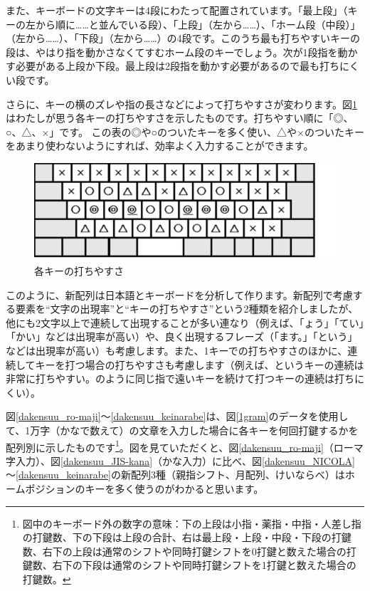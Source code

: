また、キーボードの文字キーは4段にわたって配置されています。「最上段」（キーの左から順に……と並んでいる段）、「上段」（左から……）、「ホーム段（中段）」（左から……）、「下段」（左から……）の4段です。このうち最も打ちやすいキーの段は、やはり指を動かさなくてすむホーム段のキーでしょう。次が1段指を動かす必要がある上段か下段。最上段は2段指を動かす必要があるので最も打ちにくい段です。

さらに、キーの横のズレや指の長さなどによって打ちやすさが変わります。図\ref{key_utiyasusa}はわたしが思う各キーの打ちやすさを示したものです。打ちやすい順に「◎、○、△、×」です。
この表の◎や○のついたキーを多く使い、△や×のついたキーをあまり使わないようにすれば、効率よく入力することができます。


\begin{figure}
 \begin{center}
   \includegraphics[width=14cm,clip]{res_kouy/key_utiyasusa.eps}
 \end{center}
 \caption{各キーの打ちやすさ}
 \label{key_utiyasusa}
\end{figure}

このように、新配列は日本語とキーボードを分析して作ります。新配列で考慮する要素を“文字の出現率”と“キーの打ちやすさ”という2種類を紹介しましたが、他にも2文字以上で連続して出現することが多い連なり（例えば、「ょう」「てい」「かい」などは出現率が高い）や、良く出現するフレーズ（「ます。」「という」などは出現率が高い）も考慮します。また、1キーでの打ちやすさのほかに、連続してキーを打つ場合の打ちやすさも考慮します（例えば、というキーの連続は非常に打ちやすい。のように同じ指で遠いキーを続けて打つキーの連続は打ちにくい）。

図\ref{dakensuu_ro-maji}～\ref{dakensuu_keinarabe}は、図\ref{1gram}のデータを使用して、1万字（かなで数えて）の文章を入力した場合に各キーを何回打鍵するかを配列別に示したものです\footnote{図中のキーボード外の数字の意味：下の上段は小指・薬指・中指・人差し指の打鍵数、下の下段は上段の合計、右は最上段・上段・中段・下段の打鍵数、右下の上段は通常のシフトや同時打鍵シフトを0打鍵と数えた場合の打鍵数、右下の下段は通常のシフトや同時打鍵シフトを1打鍵と数えた場合の打鍵数。}。図を見ていただくと、図\ref{dakensuu_ro-maji}（ローマ字入力）、図\ref{dakensuu_JIS-kana}（かな入力）に比べ、図\ref{dakensuu_NICOLA}～\ref{dakensuu_keinarabe}の新配列3種（親指シフト、月配列、けいならべ）はホームポジションのキーを多く使うのがわかると思います。

